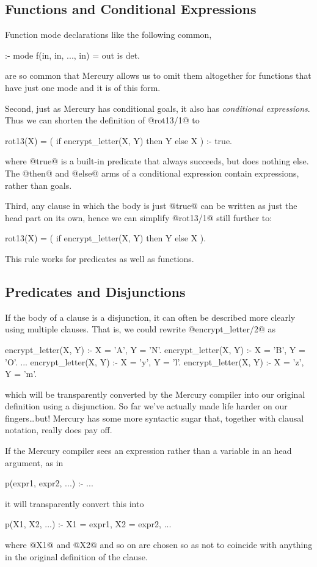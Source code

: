 \subsection{Functions and Conditional Expressions}

Function mode declarations like the following
common,
\begin{myverbatim}
:- mode f(in, in, ..., in) = out is det.
\end{myverbatim}
are so common that Mercury allows us to omit them altogether for functions
that have just one mode and it is of this form.

Second, just as Mercury has conditional goals, it also has \emph{conditional
expressions}.  Thus we can shorten the definition of @rot13/1@ to
\begin{myverbatim}
rot13(X) = ( if encrypt_letter(X, Y) then Y else X ) :-
    true.
\end{myverbatim}
where @true@ is a built-in predicate that always succeeds, but does
nothing else.  The @then@ and @else@ arms of a conditional expression
contain expressions, rather than goals.

Third, any clause in which the body is just @true@ can be written as
just the head part on its own, hence we can simplify @rot13/1@ still
further to:
\begin{myverbatim}
rot13(X) = ( if encrypt_letter(X, Y) then Y else X ).
\end{myverbatim}
This rule works for predicates as well as functions.

\subsection{Predicates and Disjunctions}

If the body of a clause is a disjunction, it can often be described more
clearly using multiple clauses.  That is, we could rewrite
@encrypt_letter/2@ as
\begin{myverbatim}
encrypt_letter(X, Y) :- X = 'A', Y = 'N'.
encrypt_letter(X, Y) :- X = 'B', Y = 'O'.
...
encrypt_letter(X, Y) :- X = 'y', Y = 'l'.
encrypt_letter(X, Y) :- X = 'z', Y = 'm'.
\end{myverbatim}
which will be transparently converted by the Mercury compiler into our
original definition using a disjunction.  So far we've actually made
life harder on our fingers\ldots but!  Mercury has some more
syntactic sugar that, together with clausal notation, really does pay
off.

If the Mercury compiler sees an expression rather than a variable in an
head argument, as in
\begin{myverbatim}
p(expr1, expr2, ...) :- ...
\end{myverbatim}
it will transparently convert this into
\begin{myverbatim}
p(X1, X2, ...) :- X1 = expr1, X2 = expr2, ...
\end{myverbatim}
where @X1@ and @X2@ and so on are chosen so as not to coincide with
anything in the original definition of the clause.

